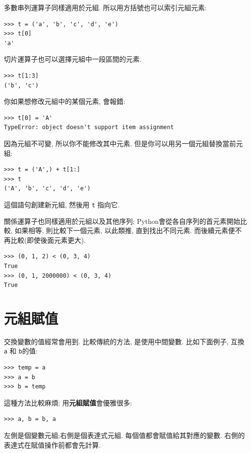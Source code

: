 \documentclass[10pt]{book}
\begin{document}
多數串列運算子同樣適用於元組. 
所以用方括號也可以索引元組元素:

\begin{verbatim}
>>> t = ('a', 'b', 'c', 'd', 'e')
>>> t[0]
'a'
\end{verbatim}
%
切片運算子也可以選擇元組中一段區間的元素. 

\begin{verbatim}
>>> t[1:3]
('b', 'c')
\end{verbatim}
%
你如果想修改元組中的某個元素, 會報錯:

\begin{verbatim}
>>> t[0] = 'A'
TypeError: object doesn't support item assignment
\end{verbatim}
%
因為元組不可變, 所以你不能修改其中元素. 
但是你可以用另一個元組替換當前元組:

\begin{verbatim}
>>> t = ('A',) + t[1:]
>>> t
('A', 'b', 'c', 'd', 'e')
\end{verbatim}
%
這個語句創建新元組, 然後用 {\tt t} 指向它. 

關係運算子也同樣適用於元組以及其他序列;
Python會從各自序列的首元素開始比較, 如果相等, 則比較下一個元素, 
以此類推, 直到找出不同元素. 
而後續元素便不再比較(即使後面元素更大). 

\begin{verbatim}
>>> (0, 1, 2) < (0, 3, 4)
True
>>> (0, 1, 2000000) < (0, 3, 4)
True
\end{verbatim}



\section{元組賦值}
\label{tuple.assignment}
交換變數的值經常會用到. 
比較傳統的方法, 是使用中間變數. 
比如下面例子, 互換 {\tt a} 和 {\tt b}的值:

\begin{verbatim}
>>> temp = a
>>> a = b
>>> b = temp
\end{verbatim}
%
這種方法比較麻煩; 用{\bf 元組賦值}會優雅很多:

\begin{verbatim}
>>> a, b = b, a
\end{verbatim}
%
左側是個變數元組;右側是個表達式元組. 
每個值都會賦值給其對應的變數. 
右側的表達式在賦值操作前都會先計算. 
\end{document}
